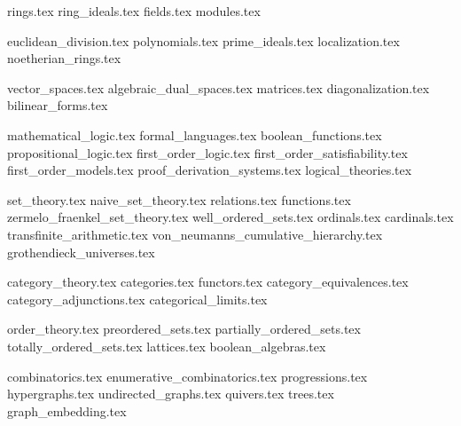 \documentclass{notebook}
\begin{document}
{rings.tex}
{ring_ideals.tex}
{fields.tex}
{modules.tex}

{euclidean_division.tex}
{polynomials.tex}
{prime_ideals.tex}
{localization.tex}
{noetherian_rings.tex}

{vector_spaces.tex}
{algebraic_dual_spaces.tex}
{matrices.tex}
{diagonalization.tex}
{bilinear_forms.tex}

{mathematical_logic.tex}
{formal_languages.tex}
{boolean_functions.tex}
{propositional_logic.tex}
{first_order_logic.tex}
{first_order_satisfiability.tex}
{first_order_models.tex}
{proof_derivation_systems.tex}
{logical_theories.tex}

{set_theory.tex}
{naive_set_theory.tex}
{relations.tex}
{functions.tex}
{zermelo_fraenkel_set_theory.tex}
{well_ordered_sets.tex}
{ordinals.tex}
{cardinals.tex}
{transfinite_arithmetic.tex}
{von_neumanns_cumulative_hierarchy.tex}
{grothendieck_universes.tex}

{category_theory.tex}
{categories.tex}
{functors.tex}
{category_equivalences.tex}
{category_adjunctions.tex}
{categorical_limits.tex}

{order_theory.tex}
{preordered_sets.tex}
{partially_ordered_sets.tex}
{totally_ordered_sets.tex}
{lattices.tex}
{boolean_algebras.tex}

{combinatorics.tex}
{enumerative_combinatorics.tex}
{progressions.tex}
{hypergraphs.tex}
{undirected_graphs.tex}
{quivers.tex}
{trees.tex}
{graph_embedding.tex}

\begin{sloppypar}
  \printbibliography
\end{sloppypar}
\end{document}
